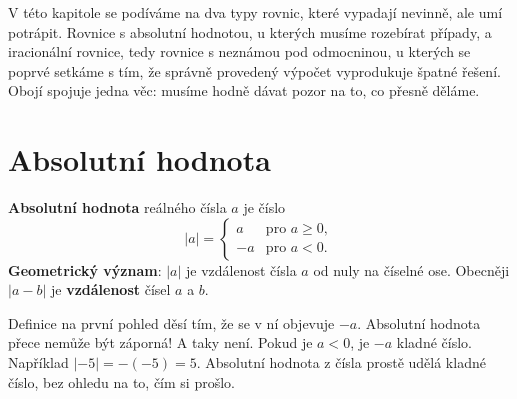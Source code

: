 \label{kap:absolutni}

V této kapitole se podíváme na dva typy rovnic, které vypadají nevinně, ale umí potrápit. Rovnice s absolutní hodnotou, u kterých musíme rozebírat případy, a iracionální rovnice, tedy rovnice s neznámou pod odmocninou, u kterých se poprvé setkáme s tím, že správně provedený výpočet vyprodukuje špatné řešení. Obojí spojuje jedna věc: musíme hodně dávat pozor na to, co přesně děláme.

\section{Absolutní hodnota}\label{sec:absolutni-hodnota}

\begin{definitionbox}
  \textbf{Absolutní hodnota} reálného čísla $a$ je číslo
  \begin{equation*}
    |a| = \begin{cases}
      a & \text{pro } a\geq 0,\\
      -a & \text{pro } a < 0.
    \end{cases}
  \end{equation*}
  \textbf{Geometrický význam}: $|a|$ je vzdálenost čísla $a$ od nuly na číselné ose. Obecněji $|a - b|$ je \textbf{vzdálenost} čísel $a$ a $b$.
\end{definitionbox}

Definice na první pohled děsí tím, že se v ní objevuje $-a$. Absolutní hodnota přece nemůže být záporná! A taky není. Pokud je $a < 0$, je $-a$ kladné číslo. Například $|-5| = -(-5) = 5$. Absolutní hodnota z čísla prostě udělá kladné číslo, bez ohledu na to, čím si prošlo.

\begin{center}
\end{center}

